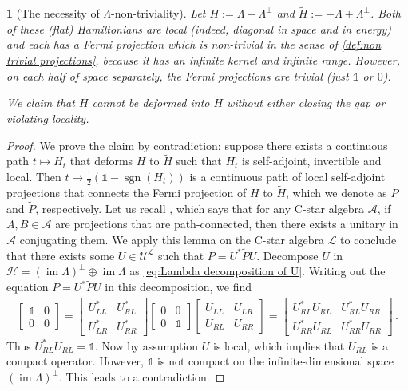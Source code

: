 \documentclass[a4paper,10pt]{article}
\numberwithin{equation}{section}
\theoremstyle{plain}
\theoremstyle{plain}
\theoremstyle{plain}
\theoremstyle{plain}
\theoremstyle{plain}
\theoremstyle{remark}
\theoremstyle{definition}
\theoremstyle{plain}
\newtheorem{example}[thm]{\protect\examplename}
\providecommand{\examplename}{Example}
\newcommand{\calA}{\mathcal{A}}
\newcommand{\calU}{\mathcal{U}}
\newcommand{\calH}{\mathcal{H}}
\newcommand{\calL}{\mathcal{L}}
\newcommand{\Id}{\mathds{1}}
\newcommand{\sgn}{\operatorname{sgn}}
\newcommand{\im}{\operatorname{im}}
\newcommand{\eq}[1]{\begin{align*}#1\end{align*}}
\begin{document}
	\begin{example}[The necessity of $\Lambda$-non-triviality]
		Let $H := \Lambda - \Lambda^\perp$ and $\widetilde{H} := -\Lambda + \Lambda^\perp$. Both of these (flat) Hamiltonians are local (indeed, diagonal in space and in energy) and each has a Fermi projection which is non-trivial in the sense of \cref{def:non trivial projections}, because it has an infinite kernel and infinite range. However, on each half of space separately, the Fermi projections are trivial (just $\Id$ or $0$). 
		
		We claim that $H$ cannot be deformed into $\widetilde{H}$ without either closing the gap or violating locality.
	\end{example}
	
	\begin{proof}
		We prove the claim by contradiction: suppose there exists a continuous path $t\mapsto H_t$ that deforms $H$ to $\widetilde{H}$ such that $H_t$ is self-adjoint, invertible and local. Then $t\mapsto \frac{1}{2}(\Id-\sgn(H_t))$ is a continuous path of local self-adjoint projections that connects the Fermi projection of $H$ to $\widetilde{H}$, which we denote as $P$ and $\widetilde{P}$, respectively. Let us recall \cite[Proposition 2.2.6]{rordam2000introduction}, which says that for any C-star algebra $\calA$, if $A,B\in\calA$ are projections that are path-connected, then there exists a unitary in $\calA$ conjugating them. We apply this lemma on the C-star algebra $\calL$ to conclude that there exists some $U\in\calU^\calL$ such that $P=U^*\widetilde{P}U$. Decompose $U$ in $\calH=(\im \Lambda)^\perp\oplus \im \Lambda$ as \cref{eq:Lambda decomposition of U}. Writing out the equation $P=U^*\widetilde{P}U$ in this decomposition, we find \eq{\begin{bmatrix}\Id & 0 \\ 0 & 0\end{bmatrix} = \begin{bmatrix}U^*_{LL}& U^*_{RL} \\ U^*_{LR} & U^*_{RR}\end{bmatrix}\begin{bmatrix}0 & 0 \\ 0 & \Id \end{bmatrix} \begin{bmatrix}U_{LL}& U_{LR} \\ U_{RL} & U_{RR}\end{bmatrix} = \begin{bmatrix}U^*_{RL}U_{RL}& U^*_{RL}U_{RR} \\ U^*_{RR}U_{RL} & U^*_{RR}U_{RR}\end{bmatrix} \,.} Thus $U_{RL}^*U_{RL}=\Id.$ Now by assumption $U$ is local, which implies that $U_{RL}$ is a compact operator. However, $\Id$ is not compact on the infinite-dimensional space $(\im\Lambda)^\perp$. This leads to a contradiction.
	\end{proof}
	
\end{document}
